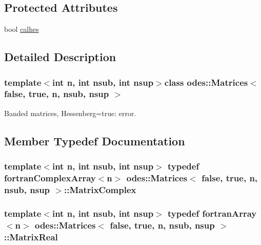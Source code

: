 \subsection*{Protected Attributes}
\begin{DoxyCompactItemize}
\item 
bool \hyperlink{classodes_1_1Matrices_3_01false_00_01true_00_01n_00_01nsub_00_01nsup_01_4_a69754fb4b71b97a43059ba4cd1d1afee}{calhes}
\end{DoxyCompactItemize}


\subsection{Detailed Description}
\subsubsection*{template$<$int n, int nsub, int nsup$>$class odes\-::\-Matrices$<$ false, true, n, nsub, nsup $>$}

Banded matrices, Hessenberg=true\-: error. 

\subsection{Member Typedef Documentation}
\hypertarget{classodes_1_1Matrices_3_01false_00_01true_00_01n_00_01nsub_00_01nsup_01_4_ab1d809758e20fa3ef210700989a47fa0}{
\subsubsection[{Matrix\-Complex}]{\setlength{\rightskip}{0pt plus 5cm}template$<$int n, int nsub, int nsup$>$ typedef {\bf fortran\-Complex\-Array}$<$n$>$ {\bf odes\-::\-Matrices}$<$ false, true, n, nsub, nsup $>$\-::{\bf Matrix\-Complex}}}\label{classodes_1_1Matrices_3_01false_00_01true_00_01n_00_01nsub_00_01nsup_01_4_ab1d809758e20fa3ef210700989a47fa0}
\hypertarget{classodes_1_1Matrices_3_01false_00_01true_00_01n_00_01nsub_00_01nsup_01_4_a63af1e92e4c06d6986909d7af6a9c0b9}{
\subsubsection[{Matrix\-Real}]{\setlength{\rightskip}{0pt plus 5cm}template$<$int n, int nsub, int nsup$>$ typedef {\bf fortran\-Array}$<$n$>$ {\bf odes\-::\-Matrices}$<$ false, true, n, nsub, nsup $>$\-::{\bf Matrix\-Real}}}\label{classodes_1_1Matrices_3_01false_00_01true_00_01n_00_01nsub_00_01nsup_01_4_a63af1e92e4c06d6986909d7af6a9c0b9}


